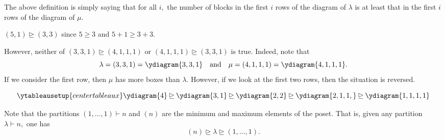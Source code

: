 \begin{rem}
	The above definition is simply saying that for all $i,$ the number of blocks in the first $i$ rows of the diagram of $\lambda$ is at least that in the first $i$ rows of the diagram of $\mu.$
\end{rem}

\begin{ex}
	$(5, 1) \unrhd (3, 3)$ since $5 \ge 3$ and $5 + 1 \ge 3 + 3.$

	However, neither of $(3, 3, 1) \unrhd (4, 1, 1, 1)$ or $(4, 1, 1, 1) \unrhd (3, 3, 1)$ is true. Indeed, note that
	\begin{equation*} 
		\lambda = (3, 3, 1) = \ydiagram{3, 3, 1} \andd \mu = (4, 1, 1, 1) = \ydiagram{4, 1, 1, 1}.
	\end{equation*}
	If we consider the first row, then $\mu$ has more boxes than $\lambda.$ However, if we look at the first two rows, then the situation is reversed.
\end{ex}
\begin{ex}
	\begin{equation*} 
		\ytableausetup{centertableaux}
		\ydiagram{4} \unrhd \ydiagram{3, 1} \unrhd \ydiagram{2, 2} \unrhd \ydiagram{2, 1, 1,} \unrhd \ydiagram{1, 1, 1, 1}
	\end{equation*}
\end{ex}
\begin{ex}
	Note that the partitions $(1, \ldots, 1) \vdash n$ and $(n)$ are the minimum and maximum elements of the poset. That is, given any partition $\lambda \vdash n,$ one has
	\begin{equation*} 
		(n) \unrhd \lambda \unrhd (1, \ldots, 1).
	\end{equation*}
\end{ex}

